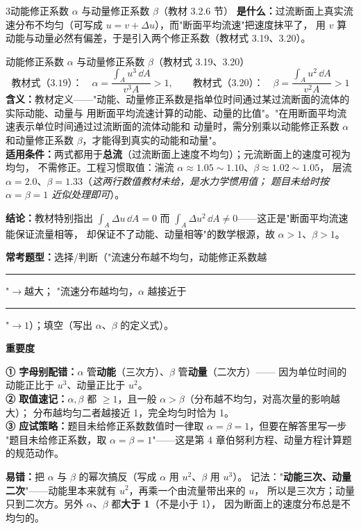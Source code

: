 \begin{kaodian}{3}{动能修正系数 $\alpha$ 与动量修正系数 $\beta$（教材 3.2.6 节）}
\textbf{是什么：}过流断面上真实流速分布不均匀（可写成 $u=v+\Delta u$），而"断面平均流速"把速度抹平了，
用 $v$ 算动能与动量必然有偏差，于是引入两个修正系数（教材式 3.19、3.20）。

\begin{gongshi}{动能修正系数 $\alpha$ 与动量修正系数 $\beta$（教材式 3.19、3.20）}
\[ \text{教材式（3.19）：}\quad \alpha=\frac{\int_A u^3\,\dd A}{v^3 A}>1,\qquad
   \text{教材式（3.20）：}\quad \beta=\frac{\int_A u^2\,\dd A}{v^2 A}>1 \]
\textbf{含义：}教材定义——"动能、动量修正系数是指单位时间通过某过流断面的流体的实际动能、动量与
用断面平均流速计算的动能、动量的比值"。"在用断面平均流速表示单位时间通过过流断面的流体动能和
动量时，需分别乘以动能修正系数 $\alpha$ 和动量修正系数 $\beta$，才能得到真实的动能和动量"。\\
\textbf{适用条件：}两式都用于\textbf{总流}（过流断面上速度不均匀）；元流断面上的速度可视为均匀，
不需修正。工程习惯取值：湍流 $\alpha\approx1.05\sim1.10$、$\beta\approx1.02\sim1.05$，
层流 $\alpha=2.0$、$\beta=1.33$（\emph{这两行数值教材未给，是水力学惯用值；
题目未给时按 $\alpha=\beta=1$ 近似处理即可}）。
\end{gongshi}

\textbf{结论：}教材特别指出 $\displaystyle\int_A \Delta u\,\dd A=0$ 而
$\displaystyle\int_A \Delta u^2\,\dd A\neq0$——这正是"断面平均流速能保证流量相等，
却保证不了动能、动量相等"的数学根源，故 $\alpha>1$、$\beta>1$。

\textbf{常考题型：}选择/判断（"流速分布越不均匀，动能修正系数越\rule{2cm}{0.4pt}"$\to$越大；
"流速分布越均匀，$\alpha$ 越接近于\rule{2cm}{0.4pt}"$\to1$）；填空（写出 $\alpha$、$\beta$ 的定义式）。

\textbf{重要度 }\quad{}\quad{}

\begin{banfa}
\textbf{① 字母别配错：}$\alpha$ 管\textbf{动能}（三次方）、$\beta$ 管\textbf{动量}（二次方）——
因为单位时间的动能正比于 $u^3$、动量正比于 $u^2$。\\
\textbf{② 取值速记：}$\alpha,\beta$ 都 $\ge1$，且一般 $\alpha>\beta$（分布越不均匀，对高次量的影响越大）；
分布越均匀二者越接近 1，完全均匀时恰为 1。\\
\textbf{③ 应试策略：}题目未给修正系数数值时一律取 $\alpha=\beta=1$，但要在解答里写一步
"题目未给修正系数，取 $\alpha=\beta=1$"——这是第 4 章伯努利方程、动量方程计算题的规范动作。
\end{banfa}

\begin{yicuo}
\textbf{易错：}把 $\alpha$ 与 $\beta$ 的幂次搞反（写成 $\alpha$ 用 $u^2$、$\beta$ 用 $u^3$）。
记法："\textbf{动能三次、动量二次}"——动能里本来就有 $u^2$，再乘一个由流量带出来的 $u$，
所以是三次方；动量只到二次方。另外 $\alpha$、$\beta$ 都\textbf{大于 1}（不是小于 1），
因为断面上的速度分布总是不均匀的。
\end{yicuo}
\end{kaodian}

